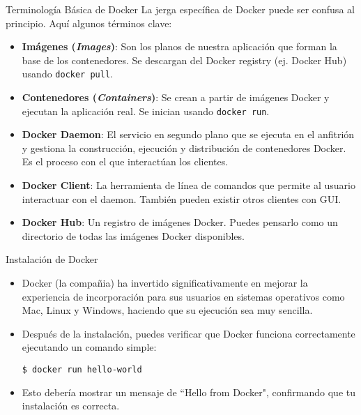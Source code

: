 \documentclass[aspectratio=169]{beamer} %
\begin{document}
\begin{frame}{Terminología Básica de Docker}
    La jerga específica de Docker puede ser confusa al principio. Aquí algunos términos clave:
    \begin{itemize}
        \item \textbf{Imágenes (\textit{Images})}: Son los planos de nuestra aplicación que forman la base de los contenedores. Se descargan del Docker registry (ej. Docker Hub) usando \texttt{docker pull}.
        \item \textbf{Contenedores (\textit{Containers})}: Se crean a partir de imágenes Docker y ejecutan la aplicación real. Se inician usando \texttt{docker run}.
        \item \textbf{Docker Daemon}: El servicio en segundo plano que se ejecuta en el anfitrión y gestiona la construcción, ejecución y distribución de contenedores Docker. Es el proceso con el que interactúan los clientes.
        \item \textbf{Docker Client}: La herramienta de línea de comandos que permite al usuario interactuar con el daemon. También pueden existir otros clientes con GUI.
        \item \textbf{Docker Hub}: Un registro de imágenes Docker. Puedes pensarlo como un directorio de todas las imágenes Docker disponibles.
    \end{itemize}
\end{frame}

\begin{frame}[containsverbatim]{Instalación de Docker}
    \begin{itemize}
        \item Docker (la compañia) ha invertido significativamente en mejorar la experiencia de incorporación para sus usuarios en sistemas operativos como Mac, Linux y Windows, haciendo que su ejecución sea muy sencilla.
        \item Después de la instalación, puedes verificar que Docker funciona correctamente ejecutando un comando simple:
        \begin{verbatim}
$ docker run hello-world
        \end{verbatim}
        \item Esto debería mostrar un mensaje de ``Hello from Docker", confirmando que tu instalación es correcta.
    \end{itemize}
\end{frame}
\end{document}
